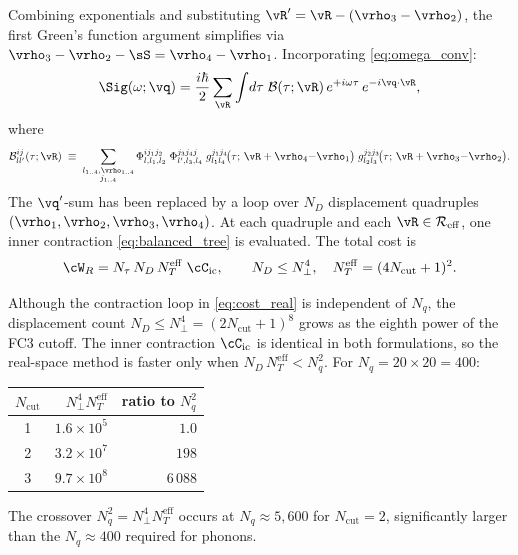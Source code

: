 Combining exponentials and substituting
$\vR' = \vR - (\vrho_3 - \vrho_2)$, the first Green's function
argument simplifies via
$\vrho_3 - \vrho_2 - \sS = \vrho_4 - \vrho_1$.
Incorporating \cref{eq:omega_conv}:
\begin{equation}
  \Sig(\omega;\vq)
  = \frac{i\hbar}{2}
    \sum_{\vR}
    \int\!d\tau\;
    \mathcal{B}(\tau;\vR)\,e^{+i\omega\tau}\,e^{-i\vq\cdot\vR},
  \label{eq:sigma_realspace}
\end{equation}
where
\begin{equation}
  \mathcal{B}^{ij}_{ll'}(\tau;\vR)
  \;\equiv\;
  \sum_{\substack{l_{1..4},\vrho_{1..4}\\j_{1..4}}}
  \Phi^{ij_1j_2}_{l,l_1,l_2}\;
  \Phi^{j_3j_4j}_{l',l_3,l_4}\;
  g^{j_1j_4}_{l_1 l_4}\!\bigl(\tau;\,\vR+\vrho_4{-}\vrho_1\bigr)\;
  g^{j_2j_3}_{l_2 l_3}\!\bigl(\tau;\,\vR+\vrho_3{-}\vrho_2\bigr).
  \label{eq:bubble_realspace}
\end{equation}
The $\vq'$-sum has been replaced by a loop over $N_D$ displacement
quadruples $(\vrho_1,\vrho_2,\vrho_3,\vrho_4)$.  At each
quadruple and each $\vR\in\mathcal{R}_\mathrm{eff}$, one inner
contraction \cref{eq:balanced_tree} is evaluated.  The total cost
is
\begin{equation}
  \cW_R
  = N_\tau\,N_D\,N_T^\mathrm{eff}\;\cC_\mathrm{ic},
  \qquad
  N_D \le N_\perp^4,\quad
  N_T^\mathrm{eff} = (4N_\mathrm{cut}+1)^2.
  \label{eq:cost_real}
\end{equation}

Although the contraction loop in \cref{eq:cost_real} is independent
of $N_q$, the displacement count $N_D \le N_\perp^4 =
(2N_\mathrm{cut}+1)^8$ grows as the eighth power of the FC3
cutoff.  The inner contraction $\cC_\mathrm{ic}$ is identical in
both formulations, so the real-space method is faster only when
$N_D\,N_T^\mathrm{eff} < N_q^2$.
For $N_q = 20\times 20 = 400$:
\begin{center}
\begin{tabular}{crr}
  \toprule
  $N_\mathrm{cut}$
    & $N_\perp^4 N_T^\mathrm{eff}$
    & ratio to $N_q^2$\\
  \midrule
  1 & $1.6\times 10^5$ & $1.0$  \\
  2 & $3.2\times 10^7$ & $198$ \\
  3 & $9.7\times 10^8$ & $6\,088$ \\
  \bottomrule
\end{tabular}
\end{center}
The crossover $N_q^2 = N_\perp^4 N_T^\mathrm{eff}$ occurs at
$N_q \approx 5{,}600$ for $N_\mathrm{cut}=2$, significantly larger than the
$N_q\approx 400$ required for phonons.

